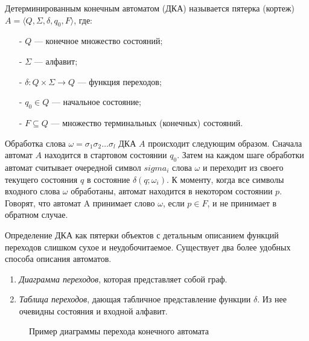 \begin{Def}
 Детерминированным конечным автоматом (ДКА) называется пятерка (кортеж) $A = \langle Q, \Sigma, \delta, q_0, F  \rangle$, где:
 \begin{itemize}
  \item [-] $Q$ --- конечное множество состояний;
  \item [-] $\Sigma$ --- алфавит;
  \item [-] $\delta : Q \times \Sigma \rightarrow Q$ --- функция переходов;
  \item [-] $q_0 \in Q$ --- начальное состояние;
  \item [-] $F \subseteq Q$ --- множество терминальных (конечных) состояний.
 \end{itemize}
\end{Def}

Обработка слова $\omega = \sigma_1\sigma_2\dots\sigma_l$ ДКА $A$ происходит следующим образом. 
Сначала автомат $A$ находится в стартовом состоянии $q_0$. 
Затем на каждом шаге обработки автомат считывает очередной символ $sigma_i$ слова $\omega$ и переходит из своего текущего состояния $q$ в состояние $\delta(q; \omega_i)$. 
К моменту, когда все символы входного слова $\omega$ обработаны, автомат находится в некотором состоянии $p$. Говорят, что автомат A принимает слово $\omega$, если $p \in F$, и не принимает в обратном случае.\cite{TA-defs}

Определение ДКА как пятерки объектов с детальным описанием функций переходов слишком сухое и неудобочитаемое.
Существует два более удобных способа описания автоматов.
\begin{enumerate}
 \item \textit{Диаграмма переходов}, которая представляет собой граф.
 \item \textit{Таблица переходов}, дающая табличное представление функции $\delta$.
 Из нее очевидны состояния и входной алфавит.
\end{enumerate}

\begin{figure}[ht]
\caption[Пример диаграммы перехода конечного автомата]{Пример диаграммы перехода конечного автомата}
\label{pic:auto}
\end{figure}

